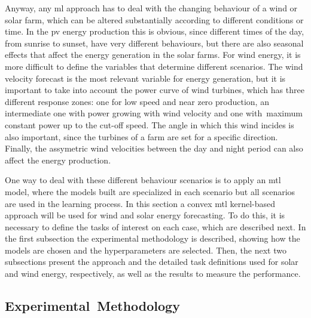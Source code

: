 Anyway, any \acrshort{ml} approach has to deal with the changing behaviour of a wind or solar farm, which can be altered substantially according to different conditions or time.
In the \acrfull{pv} energy production this is obvious, since different times of the day, from sunrise to sunset, have very different behaviours, but there are also seasonal effects that affect the energy generation in the solar farms.
For wind energy, it is more difficult to define the variables that determine different scenarios. 
The wind velocity forecast is the most relevant variable for energy generation, but it is important to take into account the power curve of wind turbines, which has three different response zones: one for low speed and near zero production, an intermediate one with power growing with wind velocity and one with~maximum constant power up to the cut-off speed.
The angle in which this wind incides is also important, since the turbines of a farm are set for a specific direction. 
Finally, the assymetric wind velocities between the day and night period can also affect the energy production.

One way to deal with these different behaviour scenarios is to apply an \acrshort{mtl} model, where the models built are specialized in each scenario but all scenarios are used in the learning process.
In this section a convex \acrshort{mtl} kernel-based approach will be used for wind and solar energy forecasting. To do this, it is necessary to define the tasks of interest on each case, which are described next.
In the first subsection the experimental methodology is described, showing how the models are chosen and the hyperparameters are selected. Then, the next two subsections present the approach and the detailed task definitions used for solar and wind energy, respectively, as well as the results to measure the performance.

\subsection{Experimental~Methodology}

